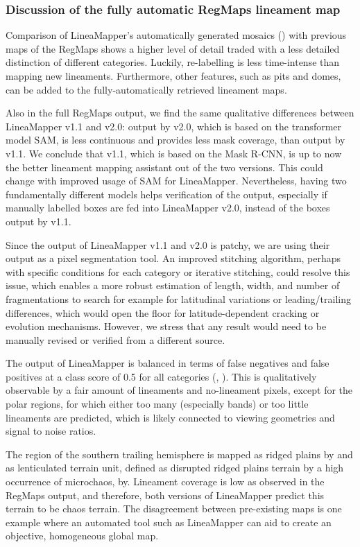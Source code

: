 \subsubsection{Discussion of the fully automatic RegMaps lineament map}
Comparison of LineaMapper's automatically generated mosaics () with previous maps of the RegMaps shows a higher level of detail traded with a less detailed distinction of different categories. Luckily, re-labelling is less time-intense than mapping new lineaments. Furthermore, other features, such as pits and domes, can be added to the fully-automatically retrieved lineament maps. 

Also in the full RegMaps output, we find the same qualitative differences between LineaMapper v1.1 and v2.0: output by v2.0, which is based on the transformer model SAM, is less continuous and provides less mask coverage, than output by v1.1. We conclude that v1.1, which is based on the Mask R-CNN, is up to now the better lineament mapping assistant out of the two versions. This could change with improved usage of SAM for LineaMapper. Nevertheless, having two fundamentally different models helps verification of the output, especially if manually labelled boxes are fed into LineaMapper v2.0, instead of the boxes output by v1.1.

Since the output of LineaMapper v1.1 and v2.0 is patchy, we are using their output as a pixel segmentation tool. An improved stitching algorithm, perhaps with specific conditions for each category or iterative stitching, could resolve this issue, which enables a more robust estimation of length, width, and number of fragmentations to search for example for latitudinal variations or leading/trailing differences, which would open the floor for latitude-dependent cracking or evolution mechanisms. However, we stress that any result would need to be manually revised or verified from a different source. 

The output of LineaMapper is balanced in terms of false negatives and false positives at a class score of 0.5 for all categories (, ). This is qualitatively observable by a fair amount of lineaments and no-lineament pixels, except for the polar regions, for which either too many (especially bands) or too little lineaments are predicted, which is likely connected to viewing geometries and signal to noise ratios.

The region of the southern trailing hemisphere is mapped as ridged plains by and as lenticulated terrain unit, defined as disrupted ridged plains terrain by a high occurrence of microchaos, by. Lineament coverage is low as observed in the RegMaps output, and therefore, both versions of LineaMapper predict this terrain to be chaos terrain. The disagreement between pre-existing maps is one example where an automated tool such as LineaMapper can aid to create an objective, homogeneous global map.

